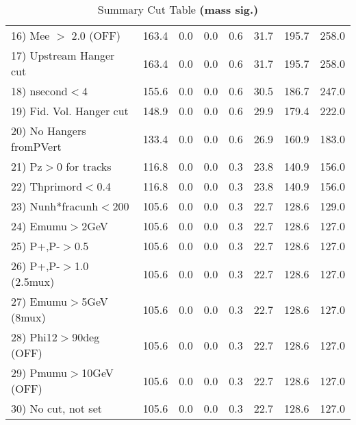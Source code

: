 \begin{table}[h!]
{{\begin{tabular}{||l||r|r|r|r|r||r||r||}
 16) Mee $>$ 2.0  (OFF)   &     163.4 &       0.0 &       0.0 &       0.6 &      31.7 &     195.7 &     258.0 \\
 17) Upstream Hanger cut  &     163.4 &       0.0 &       0.0 &       0.6 &      31.7 &     195.7 &     258.0 \\
 18) nsecond$<$4          &     155.6 &       0.0 &       0.0 &       0.6 &      30.5 &     186.7 &     247.0 \\
 19) Fid. Vol. Hanger cut &     148.9 &       0.0 &       0.0 &       0.6 &      29.9 &     179.4 &     222.0 \\
 20) No Hangers fromPVert &     133.4 &       0.0 &       0.0 &       0.6 &      26.9 &     160.9 &     183.0 \\
 21) Pz$>$0 for tracks    &     116.8 &       0.0 &       0.0 &       0.3 &      23.8 &     140.9 &     156.0 \\
 22) Thprimord$<$0.4      &     116.8 &       0.0 &       0.0 &       0.3 &      23.8 &     140.9 &     156.0 \\
 23) Nunh*fracunh$<$200   &     105.6 &       0.0 &       0.0 &       0.3 &      22.7 &     128.6 &     129.0 \\
 24) Emumu$>$2GeV         &     105.6 &       0.0 &       0.0 &       0.3 &      22.7 &     128.6 &     127.0 \\
 25) P+,P-$>$0.5          &     105.6 &       0.0 &       0.0 &       0.3 &      22.7 &     128.6 &     127.0 \\
 26) P+,P-$>$1.0 (2.5mux) &     105.6 &       0.0 &       0.0 &       0.3 &      22.7 &     128.6 &     127.0 \\
 27) Emumu$>$5GeV  (8mux) &     105.6 &       0.0 &       0.0 &       0.3 &      22.7 &     128.6 &     127.0 \\
 28) Phi12$>$90deg  (OFF) &     105.6 &       0.0 &       0.0 &       0.3 &      22.7 &     128.6 &     127.0 \\
 29) Pmumu$>$10GeV  (OFF) &     105.6 &       0.0 &       0.0 &       0.3 &      22.7 &     128.6 &     127.0 \\
 30) No cut, not set      &     105.6 &       0.0 &       0.0 &       0.3 &      22.7 &     128.6 &     127.0 \\
 \hline
 \hline
 \end{tabular}
 \caption{Summary Cut Table \textbf{ (mass sig.) }}
 \label{tab-sumcut}
 }}
 \end{table}
 \endinput
